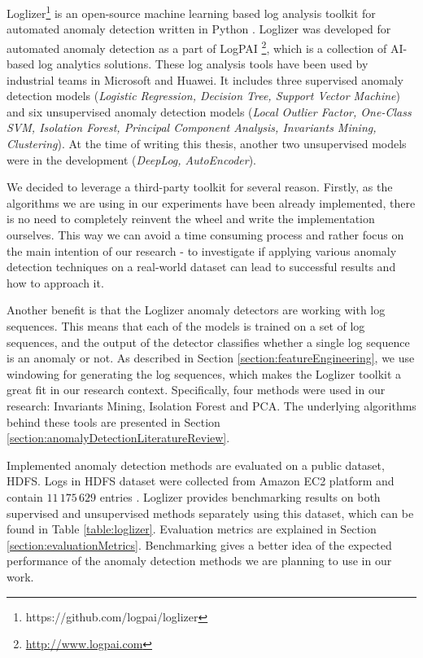 Loglizer\footnote{https://github.com/logpai/loglizer} is an open-source machine learning based log analysis toolkit for automated anomaly detection written in Python \cite{he2016}. Loglizer was developed for automated anomaly detection as a part of LogPAI \footnote{\url{http://www.logpai.com}}, which is a collection of AI-based log analytics solutions. These log analysis tools have been used by industrial teams in Microsoft and Huawei. It includes three supervised anomaly detection models (\textit{Logistic Regression, Decision Tree, Support Vector Machine}) and six unsupervised anomaly detection models (\textit{Local Outlier Factor, One-Class SVM, Isolation Forest, Principal Component Analysis, Invariants Mining, Clustering}). At the time of writing this thesis, another two unsupervised models were in the development (\textit{DeepLog, AutoEncoder}). 

We decided to leverage a third-party toolkit for several reason. Firstly, as the algorithms we are using in our experiments have been already implemented, there is no need to completely reinvent the wheel and write the implementation ourselves. This way we can avoid a time consuming process and rather focus on the main intention of our research - to investigate if applying various anomaly detection techniques on a real-world dataset can lead to successful results and how to approach it.

Another benefit is that the Loglizer anomaly detectors are working with log sequences. This means that each of the models is trained on a set of log sequences, and the output of the detector classifies whether a single log sequence is an anomaly or not. As described in Section \ref{section:featureEngineering}, we use windowing for generating the log sequences, which makes the Loglizer toolkit a great fit in our research context. Specifically, four methods were used in our research: Invariants Mining, Isolation Forest and PCA. The underlying algorithms behind these tools are presented in Section \ref{section:anomalyDetectionLiteratureReview}.

Implemented anomaly detection methods are evaluated on a public dataset, HDFS. Logs in HDFS dataset were collected from Amazon EC2 platform and contain $11\,175\,629$ entries \cite{xu2009}. Loglizer provides benchmarking results on both supervised and unsupervised methods separately using this dataset, which can be found in Table \ref{table:loglizer}. Evaluation metrics are explained in Section \ref{section:evaluationMetrics}. Benchmarking gives a better idea of the expected performance of the anomaly detection methods we are planning to use in our work. 

